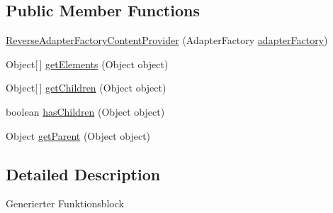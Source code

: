 \subsection*{Public Member Functions}
\begin{DoxyCompactItemize}
\item 
\hyperlink{classshootingmachineemfmodel_1_1presentation_1_1_shootingmachineemfmodel_editor_1_1_reverse_adapter_factory_content_provider_af2776a4067f1e3a2d4cac6b53150d4e5}{Reverse\-Adapter\-Factory\-Content\-Provider} (Adapter\-Factory \hyperlink{classshootingmachineemfmodel_1_1presentation_1_1_shootingmachineemfmodel_editor_a9b082c3598baf8cd6ce6b4f8af3d1e0c}{adapter\-Factory})
\item 
Object\mbox{[}$\,$\mbox{]} \hyperlink{classshootingmachineemfmodel_1_1presentation_1_1_shootingmachineemfmodel_editor_1_1_reverse_adapter_factory_content_provider_a6776efedc8087ff69c84198f89bec30d}{get\-Elements} (Object object)
\item 
Object\mbox{[}$\,$\mbox{]} \hyperlink{classshootingmachineemfmodel_1_1presentation_1_1_shootingmachineemfmodel_editor_1_1_reverse_adapter_factory_content_provider_a3509669874346c442f79e4f530ca307b}{get\-Children} (Object object)
\item 
boolean \hyperlink{classshootingmachineemfmodel_1_1presentation_1_1_shootingmachineemfmodel_editor_1_1_reverse_adapter_factory_content_provider_a010ad1a8362b29a3edfac3c30b1b20ba}{has\-Children} (Object object)
\item 
Object \hyperlink{classshootingmachineemfmodel_1_1presentation_1_1_shootingmachineemfmodel_editor_1_1_reverse_adapter_factory_content_provider_a1acf66dbd05d68b5946fdaa4a07639fa}{get\-Parent} (Object object)
\end{DoxyCompactItemize}


\subsection{Detailed Description}
Generierter Funktionsblock 

